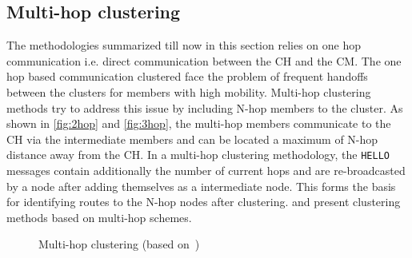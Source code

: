 \documentclass[]{ccs-thesis}
\begin{document}
\subsection{Multi-hop clustering}

The methodologies summarized till now in this section relies on one hop communication i.e. direct communication between
the \ac{CH} and the \ac{CM}. The one hop based communication clustered face the problem of frequent handoffs between
the clusters for members with high mobility. Multi-hop clustering methods try to address this issue by including N-hop
members to the cluster. As shown in \ref{fig:2hop} and \ref{fig:3hop}, the multi-hop members communicate to the \ac{CH}
via the intermediate members and can be located a maximum of N-hop distance away from the \ac{CH}. In a multi-hop
clustering methodology, the \texttt{HELLO} messages contain additionally the number of current hops and are re-broadcasted
by a node after adding themselves as a intermediate node. This forms the basis for identifying routes to the N-hop nodes
after clustering. \textcite{Zhang2069135} and \textcite{6554933} present clustering methods based on multi-hop schemes.

\begin{figure}[h]%
    \centering
    \hfill%
    \hfill%
    \caption{Multi-hop clustering (based on~\cite[Figure~1]{6554933})}%
    \label{fig:multihop}%
\end{figure}
\end{document}
